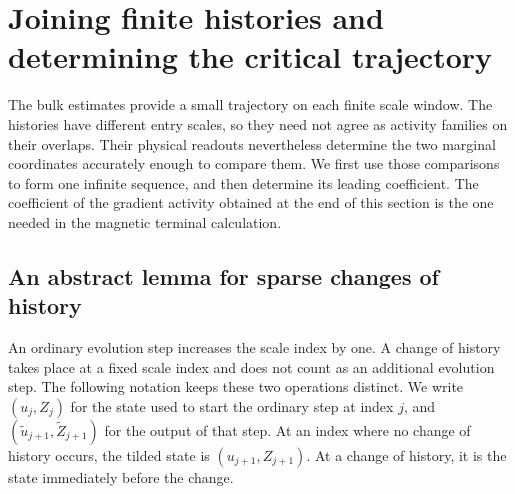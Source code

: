 \section{Joining finite histories and determining the critical trajectory}
\label{sec:trajectory}

The bulk estimates provide a small trajectory on each finite scale
window.  The histories have different entry scales, so they need not
agree as activity families on their overlaps.  Their physical readouts
nevertheless determine the two marginal coordinates accurately enough
to compare them.  We first use those comparisons to form one infinite
sequence, and then determine its leading coefficient.  The coefficient
of the gradient activity obtained at the end of this section is the
one needed in the magnetic terminal calculation.

\subsection{An abstract lemma for sparse changes of history}

An ordinary evolution step increases the scale index by one.  A change
of history takes place at a fixed scale index and does not count as an
additional evolution step.  The following notation keeps these two
operations distinct.  We write $(u_j,Z_j)$ for the state used to start
the ordinary step at index $j$, and
$(\widetilde u_{j+1},\widetilde Z_{j+1})$ for the output of that step.
At an index where no change of history occurs, the tilded state is
$(u_{j+1},Z_{j+1})$.  At a change of history, it is the state immediately
before the change.


